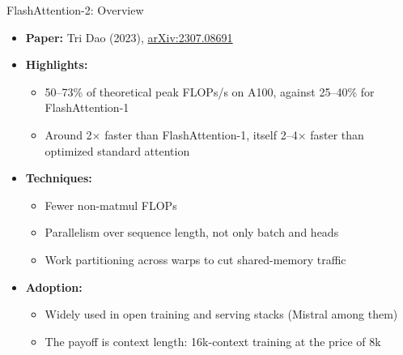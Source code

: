 \begin{frame}{FlashAttention-2: Overview}
    \begin{itemize}
        \item \textbf{Paper:} Tri Dao (2023), \href{https://arxiv.org/abs/2307.08691}{arXiv:2307.08691}
        \item \textbf{Highlights:}
        \begin{itemize}
            \item 50--73\% of theoretical peak FLOPs/s on A100, against 25--40\% for FlashAttention-1
            \item Around 2$\times$ faster than FlashAttention-1, itself 2--4$\times$ faster than optimized standard attention
        \end{itemize}
        \item \textbf{Techniques:}
        \begin{itemize}
            \item Fewer non-matmul FLOPs
            \item Parallelism over sequence length, not only batch and heads
            \item Work partitioning across warps to cut shared-memory traffic
        \end{itemize}
        \item \textbf{Adoption:}
        \begin{itemize}
            \item Widely used in open training and serving stacks (Mistral among them)
            \item The payoff is context length: 16k-context training at the price of 8k
        \end{itemize}
    \end{itemize}
\end{frame}


